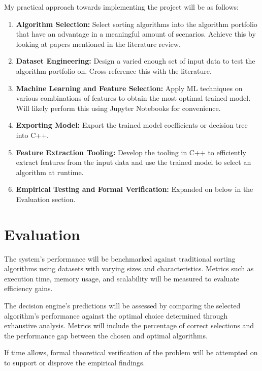 \documentclass{article}
\begin{document}
\noindent My practical approach towards implementing the project will be as follows:
\begin{enumerate}
    \item \textbf{Algorithm Selection:} Select sorting algorithms into the algorithm portfolio that have an advantage in a meaningful amount of scenarios. Achieve this by looking at papers mentioned in the literature review.
    \item \textbf{Dataset Engineering:} Design a varied enough set of input data to test the algorithm portfolio on. Cross-reference this with the literature.
    \item \textbf{Machine Learning and Feature Selection:} Apply ML techniques on various combinations of features to obtain the most optimal trained model. Will likely perform this using Jupyter Notebooks for convenience.
    \item \textbf{Exporting Model:} Export the trained model coefficients or decision tree into C++.
    \item \textbf{Feature Extraction Tooling:} Develop the tooling in C++ to efficiently extract features from the input data and use the trained model to select an algorithm at runtime.
    \item \textbf{Empirical Testing and Formal Verification:} Expanded on below in the Evaluation section.
\end{enumerate}

\section{Evaluation}
The system's performance will be benchmarked against traditional sorting algorithms using datasets with varying sizes and characteristics. Metrics such as execution time, memory usage, and scalability will be measured to evaluate efficiency gains.

The decision engine's predictions will be assessed by comparing the selected algorithm's performance against the optimal choice determined through exhaustive analysis. Metrics will include the percentage of correct selections and the performance gap between the chosen and optimal algorithms.

If time allows, formal theoretical verification of the problem will be attempted on to support or disprove the empirical findings.



\end{document}
